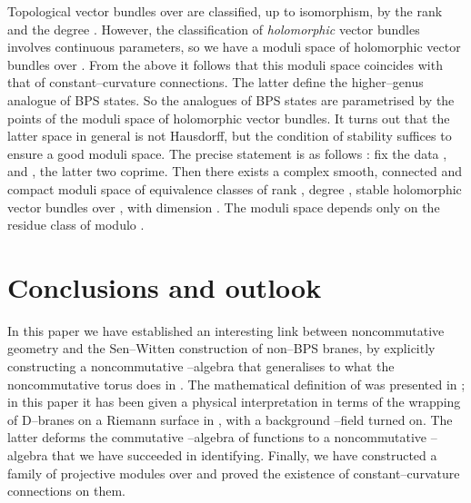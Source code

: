 \documentclass[a4paper,a4paper]{article}
\begin{document}
Topological vector bundles over \myHighlight{$\Sigma$}\coordHE{} are classified, up to isomorphism, by  
the rank \coordHE{} and the degree \coordHE{}. However, the classification of {\it  
holomorphic} vector bundles involves continuous parameters, so we have a  
moduli space of holomorphic vector bundles over \myHighlight{$\Sigma$}\coordHE{}. From the above it  
follows that this moduli space coincides with that of constant--curvature  
connections. The latter define the higher--genus analogue of BPS states. So the  
\coordHE{} analogues of BPS states are parametrised by the points of the moduli space  
of holomorphic vector bundles. It turns out that the latter space in general  
is not Hausdorff, but the condition of stability suffices to ensure a good  
moduli space. The precise statement is as follows \cite{THADDEUS}:  
fix the data \myHighlight{$\Sigma$}\coordHE{}, \coordHE{} and \coordHE{}, the latter two coprime. Then there  
exists a complex smooth, connected and compact moduli space  
\coordHE{} of  
equivalence classes of rank \coordHE{}, degree \coordHE{}, stable holomorphic vector bundles  
over \myHighlight{$\Sigma$}\coordHE{}, with dimension \coordHE{}. The moduli space  
\coordHE{} depends only on the residue class of \coordHE{} modulo \coordHE{}. 

\section{Conclusions and outlook}\label{outlook} 
 
In this paper we have established an interesting link between 
noncommutative geometry and the Sen--Witten construction of non--BPS branes,
by explicitly constructing a noncommutative \coordHE{}--algebra 
\coordHE{} that generalises to \coordHE{} what the 
noncommutative torus does in \coordHE{}. The mathematical definition of 
\coordHE{} was presented 
in \cite{PROCEEDINGS}; in this paper it has been given a physical interpretation 
in terms of the wrapping of D\coordHE{}--branes on a Riemann surface \myHighlight{$\Sigma$}\coordHE{} in \coordHE{}, 
with a background \coordHE{}--field turned on. The latter deforms the commutative 
\coordHE{}--algebra of functions to a noncommutative \coordHE{}--algebra 
that we have succeeded in identifying. Finally, we have constructed 
a family of projective modules over \coordHE{} 
and proved the existence of constant--curvature connections on them.
\end{document}
